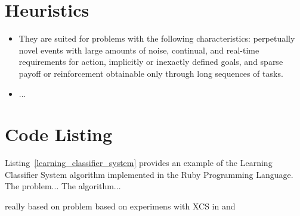 \documentclass[a4paper, 11pt]{article}
\begin{document}
\section{Heuristics}
\label{sec:heuristics}
\begin{itemize}
	\item They are suited for problems with the following characteristics: perpetually novel events with large amounts of noise, continual, and real-time requirements for action, implicitly or inexactly defined goals, and sparse payoff or reinforcement obtainable only through long sequences of tasks.
	\item ...
	
\end{itemize}

\section{Code Listing}
\label{sec:code}
Listing~\ref{learning_classifier_system} provides an example of the Learning Classifier System algorithm implemented in the Ruby Programming Language. 
The problem...
The algorithm...


really based on \cite{Butz2002a}
problem based on experimens with XCS in \cite{Wilson1995} and \cite{Wilson1998}




\end{document}
